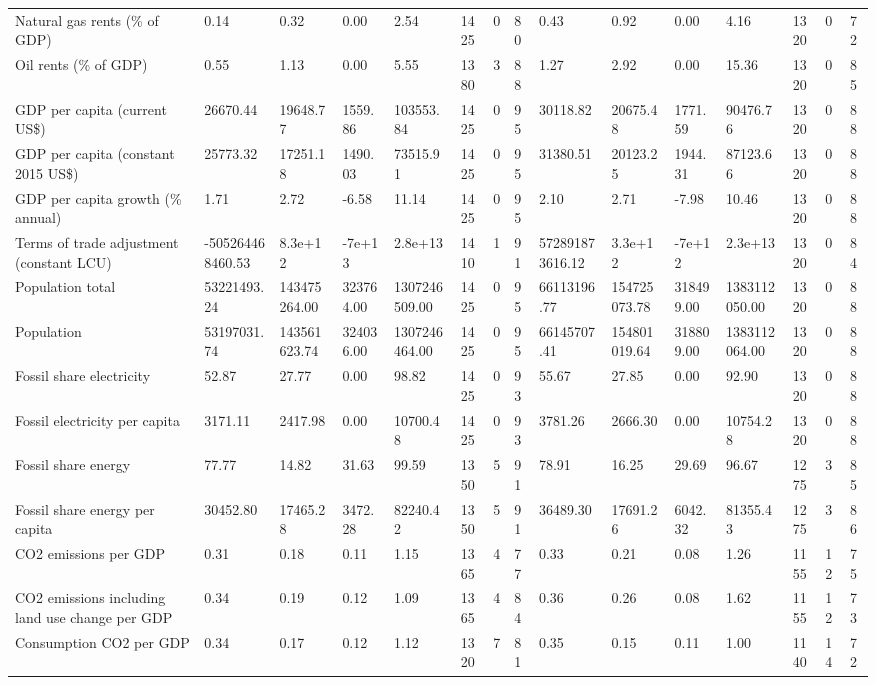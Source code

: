 \begin{longtable}{lllllllllllllll}
Natural gas rents (\% of GDP) & 0.14 & 0.32 & 0.00 & 2.54 & 1425 & 0 & 80 & 0.43 & 0.92 & 0.00 & 4.16 & 1320 & 0 & 72\\
Oil rents (\% of GDP) & 0.55 & 1.13 & 0.00 & 5.55 & 1380 & 3 & 88 & 1.27 & 2.92 & 0.00 & 15.36 & 1320 & 0 & 85\\
GDP per capita (current US\$) & 26670.44 & 19648.77 & 1559.86 & 103553.84 & 1425 & 0 & 95 & 30118.82 & 20675.48 & 1771.59 & 90476.76 & 1320 & 0 & 88\\
GDP per capita (constant 2015 US\$) & 25773.32 & 17251.18 & 1490.03 & 73515.91 & 1425 & 0 & 95 & 31380.51 & 20123.25 & 1944.31 & 87123.66 & 1320 & 0 & 88\\
\addlinespace
GDP per capita growth (\% annual) & 1.71 & 2.72 & -6.58 & 11.14 & 1425 & 0 & 95 & 2.10 & 2.71 & -7.98 & 10.46 & 1320 & 0 & 88\\
Terms of trade adjustment (constant LCU) & -505264468460.53 & 8.3e+12 & -7e+13 & 2.8e+13 & 1410 & 1 & 91 & 572891873616.12 & 3.3e+12 & -7e+12 & 2.3e+13 & 1320 & 0 & 84\\
Population total & 53221493.24 & 143475264.00 & 323764.00 & 1307246509.00 & 1425 & 0 & 95 & 66113196.77 & 154725073.78 & 318499.00 & 1383112050.00 & 1320 & 0 & 88\\
Population & 53197031.74 & 143561623.74 & 324036.00 & 1307246464.00 & 1425 & 0 & 95 & 66145707.41 & 154801019.64 & 318809.00 & 1383112064.00 & 1320 & 0 & 88\\
Fossil share electricity & 52.87 & 27.77 & 0.00 & 98.82 & 1425 & 0 & 93 & 55.67 & 27.85 & 0.00 & 92.90 & 1320 & 0 & 88\\
\addlinespace
Fossil electricity per capita & 3171.11 & 2417.98 & 0.00 & 10700.48 & 1425 & 0 & 93 & 3781.26 & 2666.30 & 0.00 & 10754.28 & 1320 & 0 & 88\\
Fossil share energy & 77.77 & 14.82 & 31.63 & 99.59 & 1350 & 5 & 91 & 78.91 & 16.25 & 29.69 & 96.67 & 1275 & 3 & 85\\
Fossil share energy per capita & 30452.80 & 17465.28 & 3472.28 & 82240.42 & 1350 & 5 & 91 & 36489.30 & 17691.26 & 6042.32 & 81355.43 & 1275 & 3 & 86\\
CO2 emissions per GDP & 0.31 & 0.18 & 0.11 & 1.15 & 1365 & 4 & 77 & 0.33 & 0.21 & 0.08 & 1.26 & 1155 & 12 & 75\\
CO2 emissions including land use change per GDP & 0.34 & 0.19 & 0.12 & 1.09 & 1365 & 4 & 84 & 0.36 & 0.26 & 0.08 & 1.62 & 1155 & 12 & 73\\
\addlinespace
Consumption CO2 per GDP & 0.34 & 0.17 & 0.12 & 1.12 & 1320 & 7 & 81 & 0.35 & 0.15 & 0.11 & 1.00 & 1140 & 14 & 72\\

\end{longtable}
